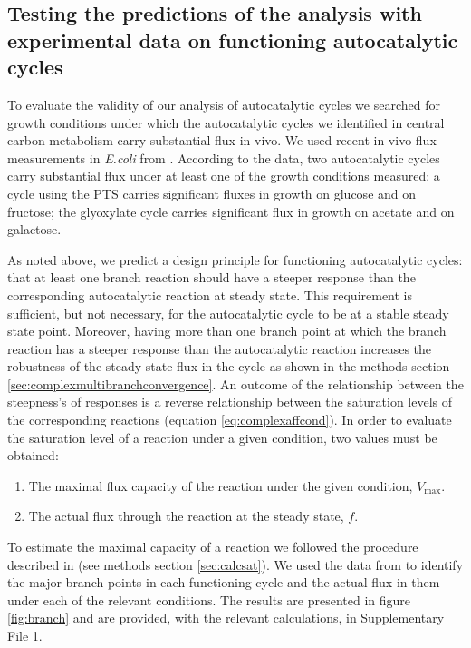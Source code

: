     \subsection{Testing the predictions of the analysis with experimental data on functioning autocatalytic cycles}
    To evaluate the validity of our analysis of autocatalytic cycles we searched for growth conditions under which the autocatalytic cycles we identified in central carbon metabolism carry substantial flux in-vivo.
    We used recent in-vivo flux measurements in \emph{E.coli} from \cite{Gerosa2015-oq}.
    According to the data, two autocatalytic cycles carry substantial flux under at least one of the growth conditions measured:
    a cycle using the PTS carries significant fluxes in growth on glucose and on fructose;
    the glyoxylate cycle carries significant flux in growth on acetate and on galactose.

    As noted above, we predict a design principle for functioning autocatalytic cycles: that at least one branch reaction should have a steeper response than the corresponding autocatalytic reaction at steady state.
    This requirement is sufficient, but not necessary, for the autocatalytic cycle to be at a stable steady state point.
    Moreover, having more than one branch point at which the branch reaction has a steeper response than the autocatalytic reaction increases the robustness of the steady state flux in the cycle as shown in the methods section \ref{sec:complexmultibranchconvergence}.
    An outcome of the relationship between the steepness's of responses is a reverse relationship between the saturation levels of the corresponding reactions (equation \ref{eq:complexaffcond}).
    In order to evaluate the saturation level of a reaction under a given condition, two values must be obtained:
    \begin{enumerate}
      \item The maximal flux capacity of the reaction under the given condition, $V_{\max}$.
        \item The actual flux through the reaction at the steady state, $f$.
    \end{enumerate}

    To estimate the maximal capacity of a reaction we followed the procedure described in \cite{Davidi2016-ga} (see methods section \ref{sec:calcsat}).
    We used the data from \cite{Gerosa2015-oq} to identify the major branch points in each functioning cycle and the actual flux in them under each of the relevant conditions.
    The results are presented in figure \ref{fig:branch} and are provided, with the relevant calculations, in Supplementary File 1.


